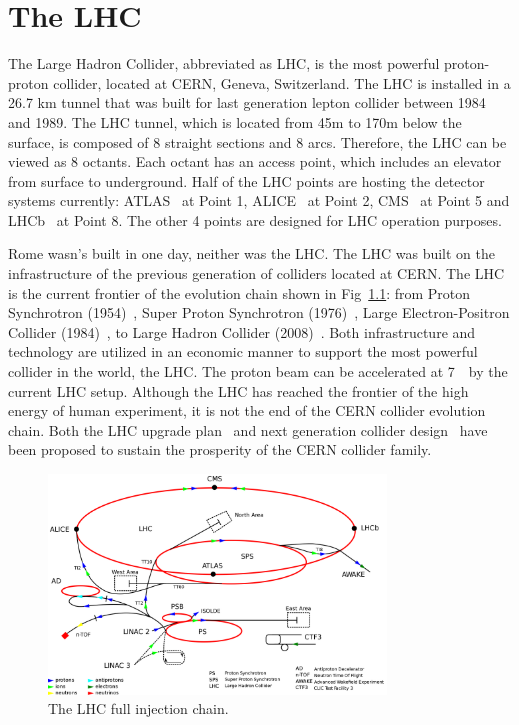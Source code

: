 \chapter{The LHC}
\label{ch:lhc}
\par The Large Hadron Collider, abbreviated as LHC, is the most powerful proton-proton collider, located at CERN, Geneva, Switzerland. The LHC is installed in a 26.7 km tunnel that was built for last generation lepton collider between 1984 and 1989. The LHC tunnel, which is located from 45m to 170m below the surface, is composed of 8 straight sections and 8 arcs. Therefore, the LHC can be viewed as 8 octants. Each octant has an access point, which includes an elevator from surface to underground. Half of the LHC points are hosting the detector systems currently: ATLAS~\cite{Aad:2008zzm} at Point 1, ALICE~\cite{Aamodt:2008zz} at Point 2, CMS~\cite{Chatrchyan:2008aa} at Point 5 and LHCb~\cite{Alves:2008zz} at Point 8. The other 4 points are designed for LHC operation purposes.

\par Rome wasn's built in one day, neither was the LHC. The LHC was built on the infrastructure of the previous generation of colliders located at CERN. The LHC is the current frontier of the evolution chain shown in Fig~\ref{fig:c3cernaccs}: from Proton Synchrotron (1954)~\cite{Gilardoni:2011za}, Super Proton Synchrotron (1976)~\cite{Doble:2017syb}, Large Electron-Positron Collider (1984)~\cite{LepInjectorStudy:1983aa,LepInjectorStudy:1983ab}, to Large Hadron Collider (2008)~\cite{Bruning:2004ej,Buning:2004wk}. Both infrastructure and technology are utilized in an economic manner to support the most powerful collider in the world, the LHC. The proton beam can be accelerated at 7~\TeV~by the current LHC setup. Although the LHC has reached the frontier of the high energy of human experiment, it is not the end of the CERN collider evolution chain. Both the LHC upgrade plan~\cite{ApollinariG.:2017ojx} and next generation collider design~\cite{Benedikt:2018csr} have been proposed to sustain the prosperity of the CERN collider family.

\begin{figure}[htbp]
    \centering
    \includegraphics[width=0.8\textwidth]{chapters/c3/figures/cern-accelerator-complex.png}
    \caption{The LHC full injection chain.}
    \label{fig:c3cernaccs}
\end{figure}

